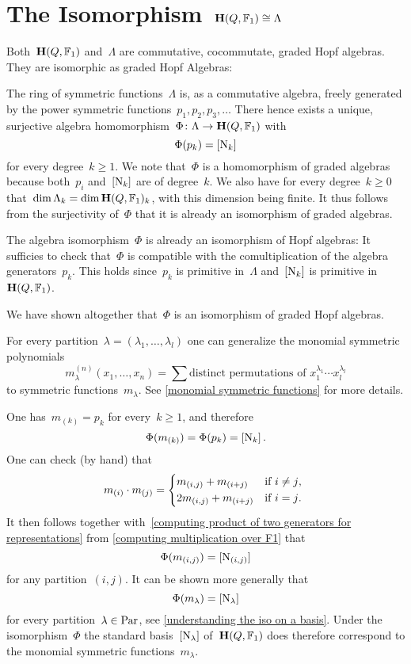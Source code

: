 \documentclass[a4paper,11pt]{scrartcl}
\begin{document}
\section{The Isomorphism~$\mathbf{H}(Q, \mathbb{F}_1) \cong \Lambda$}
\label{the isomorphism}

Both~$\mathbf{H}(Q, \mathbb{F}_1)$ and~$\Lambda$ are commutative, cocommutate, graded Hopf algebras.
They are isomorphic as graded Hopf Algebras:

The ring of symmetric functions~$\Lambda$ is, as a commutative algebra, freely generated by the power symmetric functions~$p_1, p_2, p_3, \dotsc$
There hence exists a unique, surjective algebra homomorphism~$\Phi \colon \Lambda \to \mathbf{H}(Q, \mathbb{F}_1)$ with
\[
  \Phi(p_k) = [\mathrm{N}_k]
\]
for every degree~$k \geq 1$.
We note that~$\Phi$ is a homomorphism of graded algebras because both~$p_i$ and~$[ \mathrm{N}_k ]$ are of degree~$k$.
We also have for every degree~$k \geq 0$ that~$\dim \Lambda_k = \dim \mathbf{H}(Q, \mathbb{F}_1)_k$, with this dimension being finite.
It thus follows from the surjectivity of~$\Phi$ that it is already an isomorphism of graded algebras.

The algebra isomorphism~$\Phi$ is already an isomorphism of Hopf algebras:
It sufficies to check that~$\Phi$ is compatible with the comultiplication of the algebra generators~$p_k$.
This holds since~$p_k$ is primitive in~$\Lambda$ and~$[ \mathrm{N}_k ]$ is primitive in~$\mathbf{H}(Q, \mathbb{F}_1)$.

We have shown altogether that~$\Phi$ is an isomorphism of graded Hopf algebras.

\begin{remark}
  For every partition~$\lambda = (\lambda_1, \dotsc, \lambda_l)$ one can generalize the monomial symmetric polynomials
  \[
    m^{(n)}_\lambda(x_1, \dotsc, x_n)
    =
    \sum \text{distinct permutations of~$x_1^{\lambda_1} \dotsm x_l^{\lambda_l}$}
  \]
  to symmetric functions~$m_\lambda$.
  See \cref{monomial symmetric functions} for more details.

  One has~$m_{(k)} = p_k$ for every~$k \geq 1$, and therefore
  \[
    \Phi( m_{(k)} )
    =
    \Phi(p_k)
    =
    [ \mathrm{N}_k ] \,.
  \]
  One can check (by hand) that
  \[
    m_{(i)} \cdot m_{(j)}
    =
    \begin{cases*}
      m_{(i,j)} + m_{(i+j)}
      &
      if~$i \neq j$,
      \\
      2 m_{(i,j)} + m_{(i+j)}
      &
      if~$i = j$.
    \end{cases*}
  \]
  It then follows together with~\eqref{computing product of two generators for representations} from \cref{computing multiplication over F1} that
  \[
    \Phi( m_{(i,j)} )
    =
    [ \mathrm{N}_{(i,j)} ]
  \]
  for any partition~$(i,j)$.
  It can be shown more generally that
  \[
    \Phi( m_\lambda )
    =
    [ \mathrm{N}_\lambda ]
  \]
  for every partition~$\lambda \in \mathrm{Par}$, see \cref{understanding the iso on a basis}.
  Under the isomorphism~$\Phi$ the standard basis~$[\mathrm{N}_\lambda]$ of~$\mathbf{H}(Q, \mathbb{F}_1)$ does therefore correspond to the monomial symmetric functions~$m_\lambda$.
\end{remark}
\end{document}
